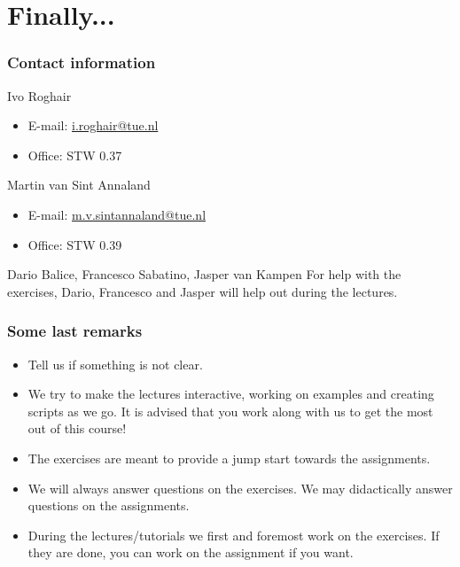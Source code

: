 \documentclass[11pt,table,final,fleqn,xcolor={usenames,dvipsnames},handout]{beamer}
\begin{document}
\section{Finally...}
\begin{frame}
 \frametitle{Contact information}
 \begin{block}{Ivo Roghair}
  \begin{itemize}
   \item E-mail: \href{mailto:i.roghair@tue.nl}{i.roghair@tue.nl}
   \item Office: STW 0.37
   \end{itemize} 
 \end{block}
 \vspace{1em}
  \begin{block}{Martin van Sint Annaland}
  \begin{itemize}
   \item E-mail: \href{mailto:m.v.sintannaland@tue.nl}{m.v.sintannaland@tue.nl}
   \item Office: STW 0.39 
   \end{itemize} 
 \end{block}
 \begin{block}{Dario Balice, Francesco Sabatino, Jasper van Kampen}
    For help with the exercises, Dario, Francesco and Jasper will help out during the lectures.\\
  \end{block}
\end{frame}

\begin{frame}
 \frametitle{Some last remarks}
  \begin{itemize}
   \item Tell us if something is not clear.
   \item We try to make the lectures interactive, working on examples and creating scripts as we go. It is advised that you work along with us to get the most out of this course!
   \item The exercises are meant to provide a jump start towards the assignments.
   \item We will always answer questions on the exercises. We may didactically answer questions on the assignments.
   \item During the lectures/tutorials we first and foremost work on the exercises. If they are done, you can work on the assignment if you want.
   \end{itemize} 
\end{frame}
\end{document}
